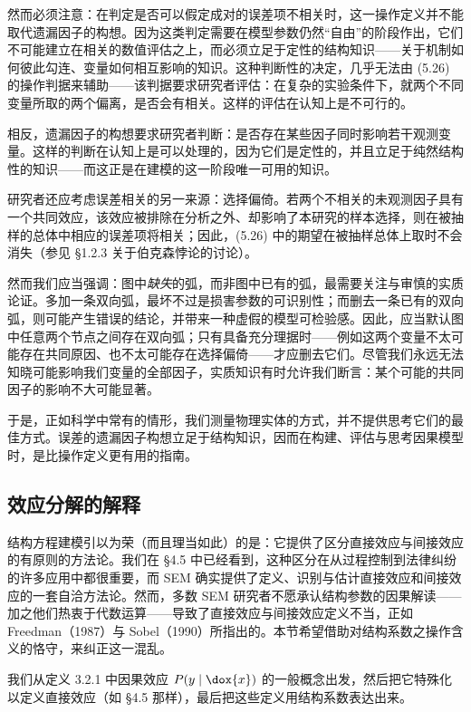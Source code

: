 然而必须注意：在判定是否可以假定成对的误差项不相关时，这一操作定义并不能取代遗漏因子的构想。因为这类判定需要在模型参数仍然“自由”的阶段作出，它们不可能建立在相关的数值评估之上，而必须立足于定性的结构知识——关于机制如何彼此勾连、变量如何相互影响的知识。这种判断性的决定，几乎无法由 \textup{(5.26)} 的操作判据来辅助——该判据要求研究者评估：在复杂的实验条件下，就两个不同变量所取的两个偏离，是否会有相关。这样的评估在认知上是不可行的。

相反，遗漏因子的构想要求研究者判断：是否存在某些因子同时影响若干观测变量。这样的判断在认知上是可以处理的，因为它们是定性的，并且立足于纯然结构性的知识——而这正是在建模的这一阶段唯一可用的知识。

研究者还应考虑误差相关的另一来源：选择偏倚。若两个不相关的未观测因子具有一个共同效应，该效应被排除在分析之外、却影响了本研究的样本选择，则在被抽样的总体中相应的误差项将相关；因此，\textup{(5.26)} 中的期望在被抽样总体上取时不会消失（参见 \S 1.2.3 关于伯克森悖论的讨论）。

然而我们应当强调：图中\emph{缺失}的弧，而非图中已有的弧，最需要关注与审慎的实质论证。多加一条双向弧，最坏不过是损害参数的可识别性；而删去一条已有的双向弧，则可能产生错误的结论，并带来一种虚假的模型可检验感。因此，应当默认图中任意两个节点之间存在双向弧；只有具备充分理据时——例如这两个变量不太可能存在共同原因、也不太可能存在选择偏倚——才应删去它们。尽管我们永远无法知晓可能影响我们变量的全部因子，实质知识有时允许我们断言：某个可能的共同因子的影响不大可能显著。

于是，正如科学中常有的情形，我们测量物理实体的方式，并不提供思考它们的最佳方式。误差的遗漏因子构想立足于结构知识，因而在构建、评估与思考因果模型时，是比操作定义更有用的指南。

\subsection{效应分解的解释}

结构方程建模引以为荣（而且理当如此）的是：它提供了区分直接效应与间接效应的有原则的方法论。我们在 \S 4.5 中已经看到，这种区分在从过程控制到法律纠纷的许多应用中都很重要，而 SEM 确实提供了定义、识别与估计直接效应和间接效应的一套自洽方法论。然而，多数 SEM 研究者不愿承认结构参数的因果解读——加之他们热衷于代数运算——导致了直接效应与间接效应定义不当，正如 Freedman（1987）与 Sobel（1990）所指出的。本节希望借助对结构系数之操作含义的恪守，来纠正这一混乱。

我们从定义 3.2.1 中因果效应 $P(y\mid \dox{x})$ 的一般概念出发，然后把它特殊化以定义直接效应（如 \S 4.5 那样），最后把这些定义用结构系数表达出来。

